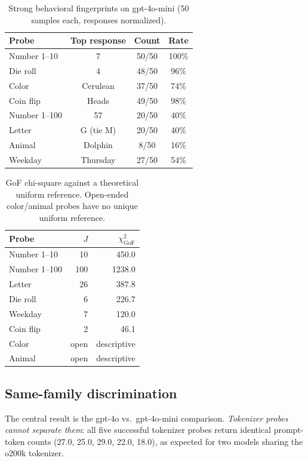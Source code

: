 \documentclass[11pt]{article}
\begin{document}
\begin{table}[h]
\centering
\small
\begin{tabular}{lccc}
\toprule
Probe & Top response & Count & Rate \\
\midrule
Number 1--10 & 7 & 50/50 & 100\% \\
Die roll & 4 & 48/50 & 96\% \\
Color & Cerulean & 37/50 & 74\% \\
Coin flip & Heads & 49/50 & 98\% \\
Number 1--100 & 57 & 20/50 & 40\% \\
Letter & G (tie M) & 20/50 & 40\% \\
Animal & Dolphin & 8/50 & 16\% \\
Weekday & Thursday & 27/50 & 54\% \\
\bottomrule
\end{tabular}
\caption{Strong behavioral fingerprints on gpt-4o-mini (50 samples each, responses normalized).}\label{tab:single}
\end{table}

\begin{table}[h]
\centering
\small
\begin{tabular}{lrr}
\toprule
Probe & $J$ & $\chi^2_{\mathrm{GoF}}$ \\
\midrule
Number 1--10 & 10 & 450.0 \\
Number 1--100 & 100 & 1238.0 \\
Letter & 26 & 387.8 \\
Die roll & 6 & 226.7 \\
Weekday & 7 & 120.0 \\
Coin flip & 2 & 46.1 \\
Color & open & descriptive \\
Animal & open & descriptive \\
\bottomrule
\end{tabular}
\caption{GoF chi-square against a theoretical uniform reference. Open-ended color/animal probes have no unique uniform reference.}\label{tab:gof}
\end{table}

\subsection{Same-family discrimination}
\label{sec:same}

The central result is the gpt-4o vs.\ gpt-4o-mini comparison. \emph{Tokenizer probes cannot separate them}: all five successful tokenizer probes return identical prompt-token counts (27.0, 25.0, 29.0, 22.0, 18.0), as expected for two models sharing the o200k tokenizer.
\end{document}
